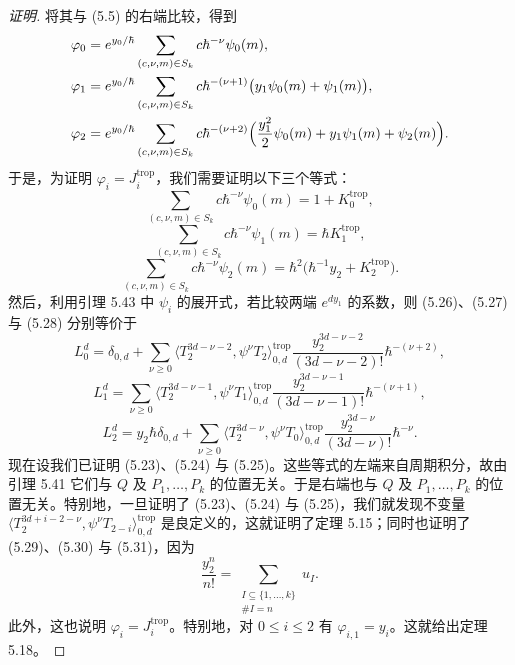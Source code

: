 \begin{proof}[证明]
将其与 (5.5) 的右端比较，得到
\begin{align*}
  \varphi_0&=e^{y_0/\hbar}\sum_{(c,\nu,m)\in S_k}c\hbar^{-\nu}\psi_0(m),\\
  \varphi_1&=e^{y_0/\hbar}\sum_{(c,\nu,m)\in S_k}c\hbar^{-(\nu+1)}\bigl(y_1\psi_0(m)+\psi_1(m)\bigr),\\
  \varphi_2&=e^{y_0/\hbar}\sum_{(c,\nu,m)\in S_k}c\hbar^{-(\nu+2)}\Bigl(\frac{y_1^2}{2}\psi_0(m)+y_1\psi_1(m)+\psi_2(m)\Bigr).
\end{align*}
于是，为证明 $\varphi_i=J_i^{\mathrm{trop}}$，我们需要证明以下三个等式：
\begin{equation}
  \sum_{(c,\nu,m)\in S_k}c\hbar^{-\nu}\psi_0(m)=1+K_0^{\mathrm{trop}}, \tag{5.26}
\end{equation}
\begin{equation}
  \sum_{(c,\nu,m)\in S_k}c\hbar^{-\nu}\psi_1(m)=\hbar K_1^{\mathrm{trop}}, \tag{5.27}
\end{equation}
\begin{equation}
  \sum_{(c,\nu,m)\in S_k}c\hbar^{-\nu}\psi_2(m)=\hbar^2\bigl(\hbar^{-1}y_2+K_2^{\mathrm{trop}}\bigr). \tag{5.28}
\end{equation}
然后，利用引理 5.43 中 $\psi_i$ 的展开式，若比较两端 $e^{dy_1}$ 的系数，则 (5.26)、(5.27) 与 (5.28) 分别等价于
\begin{equation}
  L_0^d=\delta_{0,d}+\sum_{\nu\ge 0}\langle T_2^{3d-\nu-2},\psi^\nu T_2\rangle_{0,d}^{\mathrm{trop}}
  \frac{y_2^{3d-\nu-2}}{(3d-\nu-2)!}\hbar^{-(\nu+2)}, \tag{5.29}
\end{equation}
\begin{equation}
  L_1^d=\sum_{\nu\ge 0}\langle T_2^{3d-\nu-1},\psi^\nu T_1\rangle_{0,d}^{\mathrm{trop}}
  \frac{y_2^{3d-\nu-1}}{(3d-\nu-1)!}\hbar^{-(\nu+1)}, \tag{5.30}
\end{equation}
\begin{equation}
  L_2^d=y_2\hbar\delta_{0,d}+\sum_{\nu\ge 0}\langle T_2^{3d-\nu},\psi^\nu T_0\rangle_{0,d}^{\mathrm{trop}}
  \frac{y_2^{3d-\nu}}{(3d-\nu)!}\hbar^{-\nu}. \tag{5.31}
\end{equation}
现在设我们已证明 (5.23)、(5.24) 与 (5.25)。这些等式的左端来自周期积分，故由引理 5.41 它们与 $Q$ 及 $P_1,\ldots,P_k$ 的位置无关。于是右端也与 $Q$ 及 $P_1,\ldots,P_k$ 的位置无关。特别地，一旦证明了 (5.23)、(5.24) 与 (5.25)，我们就发现不变量 $\langle T_2^{3d+i-2-\nu},\psi^\nu T_{2-i}\rangle_{0,d}^{\mathrm{trop}}$ 是良定义的，这就证明了定理 5.15；同时也证明了 (5.29)、(5.30) 与 (5.31)，因为
\[
  \frac{y_2^n}{n!}=\sum_{\substack{I\subseteq\{1,\ldots,k\}\\ \#I=n}}u_I.
\]
此外，这也说明 $\varphi_i=J_i^{\mathrm{trop}}$。特别地，对 $0\le i\le 2$ 有 $\varphi_{i,1}=y_i$。这就给出定理 5.18。
\end{proof}

